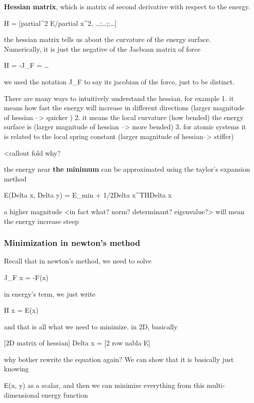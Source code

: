 \documentclass[
  11pt,
  letterpaper,
  DIV=11,
  numbers=noendperiod]{scrartcl}
\begin{document}
\textbf{Hessian matrix}, which is matrix of second derivative with
respect to the energy.

H = {[}partial\^{}2 E/partial x\^{}2, \ldots;\ldots;;\ldots{]}

the hessian matrix tells us about the curvature of the energy surface.
Numerically, it is just the negative of the Jacboan matrix of force

H = -J\_F = \ldots{}

we used the notation J\_F to say its jacobian of the force, just to be
distinct.

There are many ways to intuitively understand the hessian, for example
1. it means how fast the energy will increase in different directions
(larger magnitude of hessian --\textgreater{} quicker ) 2. it means the
local curvature (how bended) the energy surface is (larger magnitude of
hessian --\textgreater{} more bended) 3. for atomic systems it is
related to the local spring constant (larger magnitude of
hessian--\textgreater{} stiffer)

\textless callout fold why?

the energy near \textbf{the minimum} can be approximated using the
taylor's expansion method

E(Delta x, Delta y) = E\_min + 1/2Delta x\^{}THDelta x

a higher magnitude \textless in fact what? norm? determinant?
eigenvalue?\textgreater{} will mean the energy increase steep

\begin{quote}
\end{quote}

\subsubsection{Minimization in newton's
method}\label{minimization-in-newtons-method}

Recall that in newton's method, we need to solve

J\_F \Delta x = -F(x)

in energy's term, we just write

H \Delta x = \nabla E(x)

and that is all what we need to minimize. in 2D, basically

{[}2D matrix of hessian{]} Delta x = {[}2 row nabla E{]}

why bother rewrite the equation again? We can show that it is basically
just knowing

E(x, y) as a scalar, and then we can minimize everything from this
multi-dimensional energy function
\end{document}
